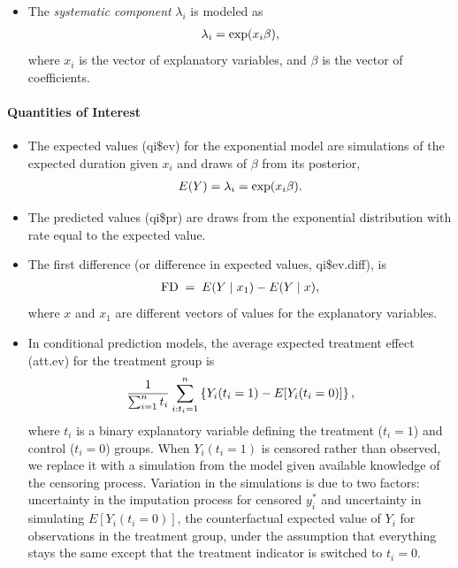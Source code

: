 \documentclass[letterpaper,10pt,english]{sphinxmanual}
\begin{document}
\begin{itemize}
\item {} 
The \emph{systematic component} \(\lambda_i\) is modeled as
\begin{gather}
\begin{split}\lambda_i = \exp(x_i \beta),\end{split}\notag
\end{gather}
where \(x_i\) is the vector of explanatory variables, and
\(\beta\) is the vector of coefficients.

\end{itemize}


\paragraph{Quantities of Interest}
\label{zelig-exp:quantities-of-interest}\begin{itemize}
\item {} 
The expected values (qi\$ev) for the exponential model are simulations
of the expected duration given \(x_i\) and draws of \(\beta\)
from its posterior,
\begin{gather}
\begin{split}E(Y) = \lambda_i = \exp(x_i \beta).\end{split}\notag
\end{gather}
\item {} 
The predicted values (qi\$pr) are draws from the exponential
distribution with rate equal to the expected value.

\item {} 
The first difference (or difference in expected values, qi\$ev.diff),
is
\begin{gather}
\begin{split}\textrm{FD} \; = \; E(Y \mid x_1) - E(Y \mid x),\end{split}\notag
\end{gather}
where \(x\) and \(x_1\) are different vectors of values for
the explanatory variables.

\item {} 
In conditional prediction models, the average expected treatment
effect (att.ev) for the treatment group is
\begin{gather}
\begin{split}\frac{1}{\sum_{i=1}^n t_i}\sum_{i:t_i=1}^n \left\{ Y_i(t_i=1) - E[Y_i(t_i=0)]
  \right\},\end{split}\notag
\end{gather}
where \(t_i\) is a binary explanatory variable defining the
treatment (\(t_i=1\)) and control (\(t_i=0\)) groups. When
\(Y_i(t_i=1)\) is censored rather than observed, we replace it
with a simulation from the model given available knowledge of the
censoring process. Variation in the simulations is due to two
factors: uncertainty in the imputation process for censored
\(y_i^*\) and uncertainty in simulating \(E[Y_i(t_i=0)]\),
the counterfactual expected value of \(Y_i\) for observations in
the treatment group, under the assumption that everything stays the
same except that the treatment indicator is switched to
\(t_i=0\).


\end{itemize}
\end{document}
